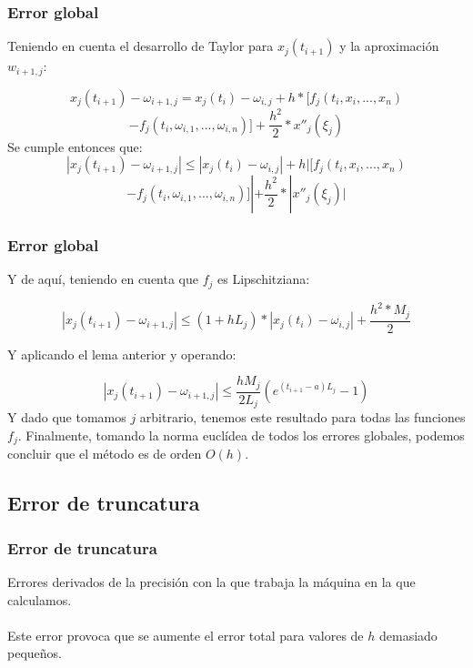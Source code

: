 \documentclass{beamer}
\begin{document}
\begin{frame}
	\frametitle{Error global}

	Teniendo en cuenta el desarrollo de Taylor para $x_j(t_{i+1})$ y la aproximación $w_{i+1,j}$:
	
	$$
	x_j(t_{i+1}) - \omega_{i+1,j} = x_j(t_i) - \omega_{i,j} + h*[f_j(t_i, x_i, ..., x_n) $$
	$$- f_j(t_i, \omega_{i,1}, ..., \omega_{i,n})] + \frac{h^2}{2}*x''_j(\xi_j) $$
	Se cumple entonces que:
	$$ | x_j(t_{i+1}) - \omega_{i+1,j} | \leq | x_j(t_i) - \omega_{i,j} | + h|[f_j(t_i, x_i, ..., x_n) $$
	$$- f_j(t_i, \omega_{i,1}, ..., \omega_{i,n})]| + \frac{h^2}{2}*|x''_j(\xi_j)| $$
	
\end{frame}

\begin{frame}
	\frametitle{Error global}
	Y de aquí, teniendo en cuenta que $f_j$ es Lipschitziana:
	
	$$ | x_j(t_{i+1}) - \omega_{i+1,j} | \leq (1+hL_j)*| x_j(t_i) - \omega_{i,j} | + \frac{h^2*M_j}{2} $$
	
	Y aplicando el lema anterior y operando:
	
	$$ | x_j(t_{i+1}) - \omega_{i+1, j} | \leq \frac{hM_j}{2L_j}(e^{(t_{i+1}-a)L_j} - 1) $$
	Y dado que tomamos $j$ arbitrario, tenemos este resultado para todas las funciones $f_j$. Finalmente, tomando la norma euclídea de todos los errores globales, podemos concluir que el método es de orden $O(h)$.
\end{frame}

\subsection{Error de truncatura}
\begin{frame}
	\frametitle{Error de truncatura}

	Errores derivados de la precisión con la que trabaja la máquina en la que calculamos.\\~\\

	Este error provoca que se aumente el error total para valores de $h$ demasiado pequeños.

\end{frame}
\end{document}
